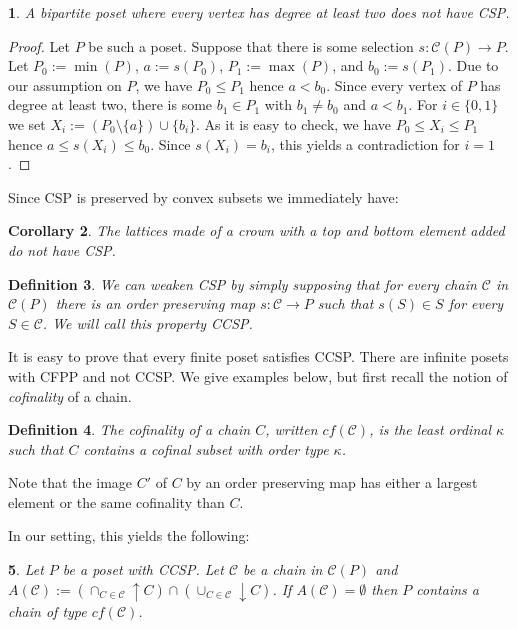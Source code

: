 \documentclass[12pt]{amsart}
\newtheorem{definition}{{\bf Definition}}[section]
\newtheorem{corollary}[definition]{{\bf Corollary}}
\newtheorem{lemma}[definition]{\noindent {\bf Lemma}}
\newtheorem{fact}[definition]{\noindent {\bf Fact}}
\begin{document}
\begin{lemma} 
A bipartite poset where every vertex has degree at least two does not have CSP.
\end{lemma}

\begin{proof} 
Let $P$ be such a poset. Suppose that there is some selection
$s:\mathcal C (P)\rightarrow P$. Let $P_0:= \min(P)$, $a:=s(P_0)$,
$P_{1}:= \max (P)$, and $b_0:=s(P_1)$. Due to our assumption on $P$, we
have $P_0\leq P_1$ hence $a<b_0$. Since every vertex of $P$ has degree
at least two, there is some $b_1\in P_1$ with $b_1\not = b_0$ and
$a<b_1$. For $i\in \{0, 1\}$ we set $X_i:=(P_0\setminus \{a\}) \cup
\{b_i\}$. As it is easy to check, we have $P_0\leq X_i\leq P_1$ hence
$a\leq s(X_i)\leq b_0$. Since $s(X_i)=b_i$, this yields a
contradiction for $i=1$. \end{proof}

Since CSP is preserved by convex subsets we immediately have:

\begin{corollary} \label{crown}
The lattices made of a crown with a top and bottom element added do  not have CSP. 
\end{corollary}

\begin{definition}
We can weaken CSP by simply supposing that for every chain $\mathcal
C$ in $\mathcal C (P)$ there is an order preserving map $s
:\mathcal{C}\rightarrow P$ such that $s(S)\in S$ for every $S\in
\mathcal{C}$. We will call this property CCSP.
\end{definition}

It is easy to prove that every finite poset satisfies CCSP.  There are
infinite posets with CFPP and not CCSP. We give examples below, but
first recall the notion of {\em cofinality} of a chain.

\begin{definition}
The {\em cofinality} of a chain $C$, written  $cf(\mathcal C)$,  is the least ordinal
$\kappa$ such that $C$ contains a cofinal subset with order type
$\kappa$. 
\end{definition}

Note that the image $C'$ of $C$ by an order preserving map
has either a largest element or the same cofinality than $C$.

In our setting, this yields the following:

\begin{fact}\label{unbounded} 
Let $P$ be a poset with CCSP. Let $\mathcal C$ be a chain in $\mathcal
C (P)$ and $A(\mathcal C):=(\cap_{C\in \mathcal C} {\uparrow \!\!}
C)\cap (\cup_{C\in \mathcal C} {\downarrow \!\!} C)$. If $A(\mathcal
C)=\emptyset$ then $P$ contains a chain of type $cf(\mathcal C)$.
\end{fact}
\end{document}
